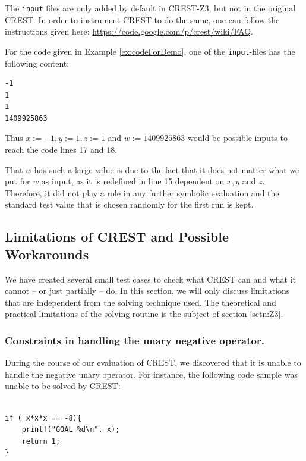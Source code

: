 \documentclass[oribibl, twocolumn]{llncs}
\begin{document}
\begin{remark}
  The \texttt{input} files are only added by default in
  \textsc{CREST-Z3}, but not in the original \textsc{CREST}. In order
  to instrument \textsc{CREST} to do the same, one can follow the
  instructions given here: \url{https://code.google.com/p/crest/wiki/FAQ}.
\end{remark}

For the code given in Example \ref{ex:codeForDemo}, one of the \texttt{input}-files has
the following content:
\begin{verbatim}
-1
1
1
1409925863
\end{verbatim}

Thus $x :=-1, y:=1, z:=1$ and $ w:=1409925863$ would be possible
inputs to reach the code lines 17 and 18.

\begin{remark}
That $w$ has such a large
value is due to the fact that it does not matter what we put for $w$
as input, as it is redefined in line 15 dependent on $x,y$ and
$z$. Therefore, it did not play a role in any further symbolic
evaluation and the standard test value that is chosen randomly for the
first run is kept.
\end{remark}

\subsection{Limitations of \textsc{CREST} and Possible Workarounds}

We have created several small test cases to check what CREST can and
what it cannot -- or just partially -- do. In this section, we will only discuss
limitations that are independent from the solving technique used. The
theoretical and practical limitations of the solving routine is the subject of section \ref{sctn:Z3}.

\subsubsection{Constraints in handling the unary negative operator.}
During the course of our evaluation of CREST, we discovered that it is unable to handle the negative unary operator. For instance, the following code sample was unable to be solved by CREST:

\begin{example}
\begin{verbatim}

if ( x*x*x == -8){
    printf("GOAL %d\n", x);
    return 1;
}
\end{verbatim}
\end{example}
\end{document}
